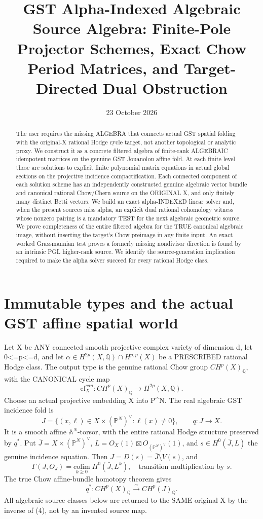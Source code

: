 \documentclass[11pt]{article}
\title{GST Alpha-Indexed Algebraic Source Algebra:
Finite-Pole Projector Schemes, Exact Chow Period Matrices,
and Target-Directed Dual Obstruction}
\date{23 October 2026}
\begin{document}
\maketitle
\begin{abstract}
The user requires the missing ALGEBRA that connects actual GST spatial
folding with the original-X rational Hodge cycle target, not another
topological or analytic proxy. We construct it as a concrete filtered
algebra of finite-rank ALGEBRAIC idempotent matrices on the genuine GST
Jouanolou affine fold. At each finite level these are solutions to
explicit finite polynomial matrix equations in actual global sections
on the projective incidence compactification. Each connected component
of each solution scheme has an independently constructed genuine
algebraic vector bundle and canonical rational Chow/Chern source on
the ORIGINAL X, and only finitely many distinct Betti vectors.
We build an exact alpha-INDEXED linear solver and, when the present
sources miss alpha, an explicit dual rational cohomology witness
whose nonzero pairing is a mandatory TEST for the next algebraic
geometric source. We prove completeness of the entire filtered
algebra for the TRUE canonical algebraic image, without inserting
the target's Chow preimage in any finite input. An exact worked
Grassmannian test proves a formerly missing nondivisor direction
is found by an intrinsic PGL higher-rank source. We identify
the source-generation implication required to make the alpha
solver succeed for every rational Hodge class.
\end{abstract}

\section{Immutable types and the actual GST affine spatial world}
Let X be ANY connected smooth projective complex variety of
dimension d, let 0<=p<=d, and let
\(\alpha\in H^{2p}(X,\mathbb Q)\cap H^{p,p}(X)\)
be a PRESCRIBED rational Hodge class.
The output type is the genuine rational Chow group
\(CH^p(X)_{\mathbb Q}\), with the CANONICAL cycle map
\[
  \mathrm{cl}^{can}_X:CH^p(X)_{\mathbb Q}
              \longrightarrow H^{2p}(X,\mathbb Q). \tag{1}
\]
Choose an actual projective embedding X into P^N.
The real algebraic GST incidence fold is
\[
 J=\{(x,\ell)\in X\times(\mathbb P^N)^\vee:
                     \ell(x)\ne0\}, \qquad q:J\to X. \tag{2}
\]
It is a smooth affine \(\mathbb A^N\)-torsor, with the entire
rational Hodge structure preserved by \(q^*\).
Put \(\bar J=X\times(\mathbb P^N)^\vee\),
\(L=O_X(1)\boxtimes O_{(\mathbb P^N)^\vee}(1)\),
and \(s\in H^0(\bar J,L)\) the genuine incidence equation.
Then \(J=D(s)=\bar J\setminus V(s)\), and
\[
 \Gamma(J,O_J)
  =\underset{k\ge0}{\mathrm{colim}}\;
    H^0(\bar J,L^k),
 \quad\text{transition multiplication by }s.      \tag{3}
\]
The true Chow affine-bundle homotopy theorem gives
\[
 q^*:CH^p(X)_{\mathbb Q}\overset{\sim}{\longrightarrow}
          CH^p(J)_{\mathbb Q}.                       \tag{4}
\]
All algebraic source classes below are returned to the SAME
original X by the inverse of (4), not by an invented source map.
\end{document}
